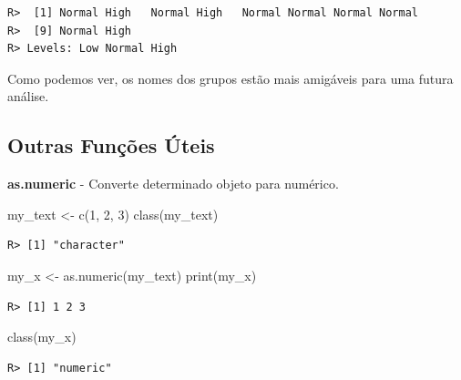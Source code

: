 \documentclass[
  11pt,
]{book}
\newenvironment{Shaded}{\begin{snugshade}}{\end{snugshade}}
\newcommand{\FunctionTok}[1]{\textcolor[rgb]{0,0,0}{#1}}
\newcommand{\NormalTok}[1]{#1}
\newcommand{\OtherTok}[1]{\textcolor[rgb]{0.37,0.37,0.37}{#1}}
\newcommand{\StringTok}[1]{\textcolor[rgb]{0.5,0.5,0.5}{#1}}
\begin{document}
\begin{verbatim}
R>  [1] Normal High   Normal High   Normal Normal Normal Normal
R>  [9] Normal High  
R> Levels: Low Normal High
\end{verbatim}

Como podemos ver, os nomes dos grupos estão mais amigáveis para uma futura análise.

\hypertarget{outras-funuxe7uxf5es-uxfateis-3}{%
\subsection{Outras Funções Úteis}\label{outras-funuxe7uxf5es-uxfateis-3}}

\textbf{as.numeric} - Converte determinado objeto para numérico.

\begin{Shaded}
\begin{Highlighting}[]
\NormalTok{my\_text }\OtherTok{\textless{}{-}} \FunctionTok{c}\NormalTok{(}\StringTok{\textquotesingle{}1\textquotesingle{}}\NormalTok{, }\StringTok{\textquotesingle{}2\textquotesingle{}}\NormalTok{, }\StringTok{\textquotesingle{}3\textquotesingle{}}\NormalTok{)}
\FunctionTok{class}\NormalTok{(my\_text)}
\end{Highlighting}
\end{Shaded}

\begin{verbatim}
R> [1] "character"
\end{verbatim}

\begin{Shaded}
\begin{Highlighting}[]
\NormalTok{my\_x }\OtherTok{\textless{}{-}} \FunctionTok{as.numeric}\NormalTok{(my\_text)}
\FunctionTok{print}\NormalTok{(my\_x)}
\end{Highlighting}
\end{Shaded}

\begin{verbatim}
R> [1] 1 2 3
\end{verbatim}

\begin{Shaded}
\begin{Highlighting}[]
\FunctionTok{class}\NormalTok{(my\_x)}
\end{Highlighting}
\end{Shaded}

\begin{verbatim}
R> [1] "numeric"
\end{verbatim}
\end{document}
